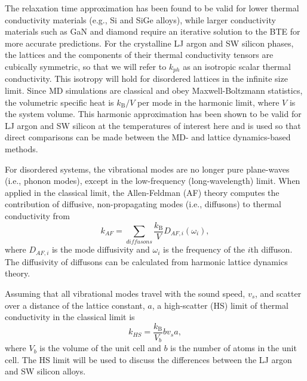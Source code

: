 \documentclass[aps,prb,onecolumn,preprint,footinbib,superscriptaddress,amsmath,amssymb,floatfix]{revtex4}
\begin{document}
The relaxation time approximation has been found to be valid  
for lower thermal conductivity materials 
(e.g., Si and SiGe alloys),
\cite{broido_intrinsic_2007,ward_intrinsic_2010,garg_role_2011} 
while larger conductivity 
materials such as GaN and diamond require an  
iterative solution to the BTE for more accurate predictions.
\cite{ward_ab_2009,lindsay_thermal_2012} 
For the crystalline LJ argon and SW silicon phases, 
the lattices and the components of their 
thermal conductivity tensors are cubically symmetric, 
so that we will refer to 
$k_{ph}$ as an isotropic scalar thermal conductivity. 
This isotropy will hold for disordered lattices 
in the infinite size limit. 
Since MD simulations are classical 
and obey Maxwell-Boltzmann 
statistics,\cite{mcquarrie_statistical_2000} the volumetric 
specific heat is $k_{\text{B}}/V$ per mode in the harmonic limit, where $V$ 
is the system volume. This harmonic approximation has been shown to be valid 
for LJ argon and SW silicon at the temperatures of interest here
\cite{larkin_comparison_2012} 
and is used so that direct comparisons can be made between 
the MD- and lattice dynamics-based methods.

For disordered systems, the vibrational modes are no 
longer pure plane-waves (i.e., phonon modes), except in the low-frequency 
(long-wavelength) limit. When applied in the classical limit, 
the Allen-Feldman (AF) theory computes 
the contribution of diffusive, non-propagating modes (i.e., diffusons) 
to thermal conductivity from\cite{allen_thermal_1993} 
\begin{equation}\label{EQ:M:k_AF}
k_{AF} = \sum_{diffusons} \frac{k_{\text{B}}}{V} D_{AF,i}(\omega_i),
\end{equation}
where $D_{AF,i}$ is the mode diffusivity and $\omega_i$ is the 
frequency of the $i$th diffuson. The diffusivity of diffusons 
can be calculated from harmonic lattice dynamics theory.
\cite{allen_thermal_1993,feldman_thermal_1993,feldman_numerical_1999} 

Assuming that all vibrational modes travel with the sound speed, $v_s$, and 
scatter over a distance of the lattice constant, $a$, 
a high-scatter (HS) limit of thermal conductivity in the classical 
limit is\cite{cahill_lattice_1988} 
\begin{equation}\label{EQ:M:k_AF,HS}
k_{HS} = \frac{k_{\text{B}}}{V_b}b v_s a,
\end{equation}
where $V_b$ is the volume of the unit cell and $b$ is the number of atoms 
in the unit cell. The HS limit will be used to 
discuss the differences between the LJ argon and SW silicon alloys. 
\end{document}
